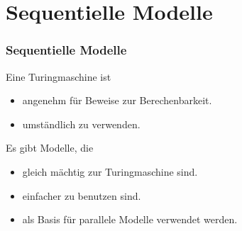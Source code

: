 \section{Sequentielle Modelle}

\begin{frame}
    \frametitle{Sequentielle Modelle}
    Eine Turingmaschine ist
    \begin{itemize}
        \item angenehm für Beweise zur Berechenbarkeit.
        \item umständlich zu verwenden.
    \end{itemize}
    \pause
    Es gibt Modelle, die
    \begin{itemize}
        \item gleich mächtig zur Turingmaschine sind.
        \item einfacher zu benutzen sind.
        \item als Basis für parallele Modelle verwendet werden.
    \end{itemize}
\end{frame}

